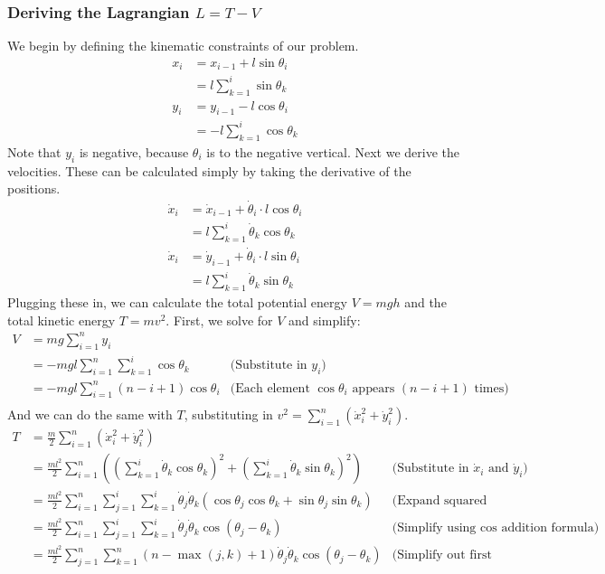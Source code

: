 \documentclass{article}
\begin{document}
\subsubsection{Deriving the Lagrangian \texorpdfstring{$L=T-V$}{L=T-V}}
We begin by defining the kinematic constraints of our problem.
\begin{align*}
	x_i &= x_{i-1} + l\sin{\theta_i}\\
	&= l\sum_{k=1}^i\sin{\theta_k}\\
	y_i &= y_{i-1} - l\cos{\theta_i}\\
	&= -l\sum_{k=1}^i\cos{\theta_k}
\end{align*}
Note that $y_i$ is negative, because $\theta_i$ is to the negative vertical. Next we derive the velocities. These can be calculated simply by taking the derivative of the positions.
\begin{align*}
	\dot{x}_i &= \dot x_{i-1} + \dot\theta_i \cdot l\cos{\theta_i}\\
	&= l\sum_{k=1}^i\dot\theta_k\cos{\theta_k}\\
	\dot{x}_i &= \dot y_{i-1} + \dot\theta_i \cdot l\sin{\theta_i}\\
	&= l\sum_{k=1}^i\dot\theta_k\sin{\theta_k}
\end{align*}
Plugging these in, we can calculate the total potential energy $V=mgh$ and the total kinetic energy $T=mv^2$. First, we solve for $V$ and simplify:
\begin{align*}
	V &= mg\sum_{i=1}^n y_i \\
	&=-mgl\sum_{i=1}^n\sum_{k=1}^i\cos\theta_k
	&\text{(Substitute in $y_i$)}\\
	&=-mgl\sum_{i=1}^n (n-i+1)\cos\theta_i
	&\text{(Each element $\cos\theta_i$ appears $(n-i+1)$ times)}\\
\end{align*}
And we can do the same with $T$, substituting in $v^2=\sum_{i=1}^n\left(\dot{x}_i^2+\dot{y}_i^2\right)$.
\begin{align*}
	T &= \frac{m}{2}\sum_{i=1}^n \left(\dot{x}_i^2+\dot{y}_i^2\right)\\
	&= \frac{ml^2}{2}\sum_{i=1}^n \left(\left(\sum_{k=1}^i\dot\theta_k\cos{\theta_k}\right)^2+\left(\sum_{k=1}^i\dot\theta_k\sin{\theta_k}\right)^2\right)
	&\text{(Substitute in $\dot x_i$ and $\dot y_i$)}\\
	&= \frac{ml^2}{2}\sum_{i=1}^n \sum_{j=1}^i\sum_{k=1}^i\dot\theta_j\dot\theta_k\left(\cos{\theta_j}\cos{\theta_k}+\sin{\theta_j}\sin{\theta_k}\right)
	&\text{(Expand squared sums)}\\
	&= \frac{ml^2}{2}\sum_{i=1}^n \sum_{j=1}^i\sum_{k=1}^i\dot\theta_j\dot\theta_k\cos(\theta_j-\theta_k)
	&\text{(Simplify using $\cos$ addition formula)}\\
	&= \frac{ml^2}{2} \sum_{j=1}^n\sum_{k=1}^n(n-\max(j,k)+1)\dot\theta_j\dot\theta_k\cos(\theta_j-\theta_k)
	&\text{(Simplify out first sum)}\\
\end{align*}
\end{document}
